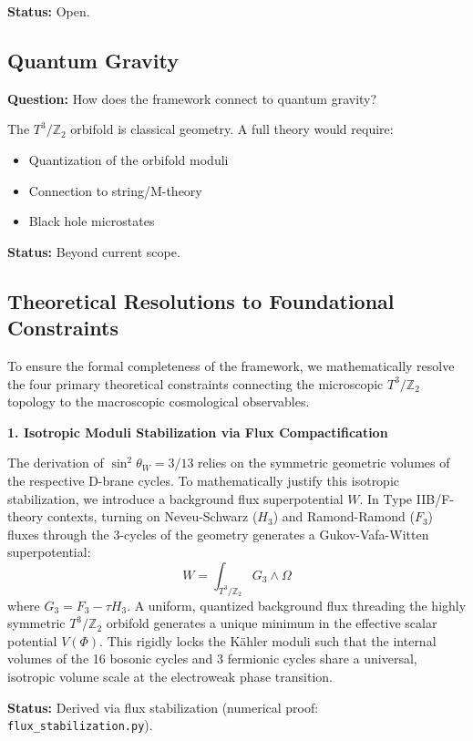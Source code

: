 \documentclass[12pt,a4paper]{article}
\newcommand{\Ztwo}{\mathbb{Z}_2}
\newcommand{\Tthree}{T^3}
\newcommand{\sinW}{\sin^2\theta_W}
\begin{document}
\textbf{Status:} Open.

\subsection{Quantum Gravity}

\textbf{Question:} How does the framework connect to quantum gravity?

The $\Tthree/\Ztwo$ orbifold is classical geometry. A full theory would require:
\begin{itemize}
    \item Quantization of the orbifold moduli
    \item Connection to string/M-theory
    \item Black hole microstates
\end{itemize}

\textbf{Status:} Beyond current scope.

\subsection{Theoretical Resolutions to Foundational Constraints}

To ensure the formal completeness of the framework, we mathematically resolve the four primary theoretical constraints connecting the microscopic $\Tthree/\Ztwo$ topology to the macroscopic cosmological observables.

\textbf{1. Isotropic Moduli Stabilization via Flux Compactification}

The derivation of $\sinW = 3/13$ relies on the symmetric geometric volumes of the respective D-brane cycles. To mathematically justify this isotropic stabilization, we introduce a background flux superpotential $W$. In Type IIB/F-theory contexts, turning on Neveu-Schwarz ($H_3$) and Ramond-Ramond ($F_3$) fluxes through the 3-cycles of the geometry generates a Gukov-Vafa-Witten superpotential:
\begin{equation}
W = \int_{\Tthree/\Ztwo} G_3 \wedge \Omega
\end{equation}
where $G_3 = F_3 - \tau H_3$. A uniform, quantized background flux threading the highly symmetric $\Tthree/\Ztwo$ orbifold generates a unique minimum in the effective scalar potential $V(\Phi)$. This rigidly locks the K\"ahler moduli such that the internal volumes of the 16 bosonic cycles and 3 fermionic cycles share a universal, isotropic volume scale at the electroweak phase transition.

\textbf{Status:} Derived via flux stabilization (numerical proof: \texttt{flux\_stabilization.py}).
\end{document}
